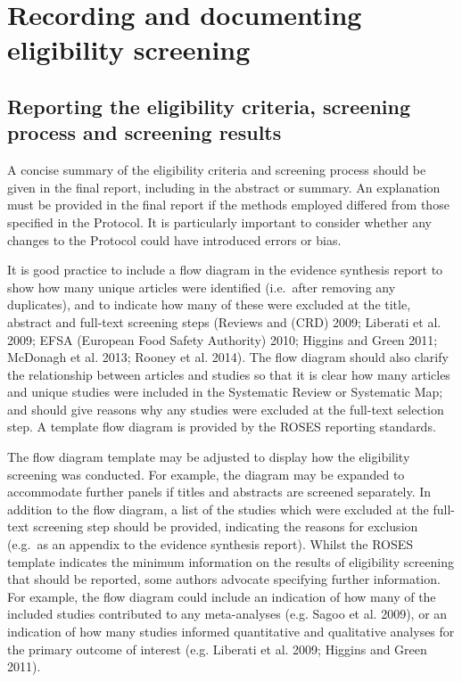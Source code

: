 \documentclass[
  letterpaper,
  DIV=11,
  numbers=noendperiod]{scrreprt}
\begin{document}
\section{Recording and documenting eligibility
screening}\label{recording-and-documenting-eligibility-screening}

\subsection{Reporting the eligibility criteria, screening process and
screening
results}\label{reporting-the-eligibility-criteria-screening-process-and-screening-results}

A concise summary of the eligibility criteria and screening process
should be given in the final report, including in the abstract or
summary. An explanation must be provided in the final report if the
methods employed differed from those specified in the Protocol. It is
particularly important to consider whether any changes to the Protocol
could have introduced errors or bias.

It is good practice to include a flow diagram in the evidence synthesis
report to show how many unique articles were identified (i.e.~after
removing any duplicates), and to indicate how many of these were
excluded at the title, abstract and full-text screening steps (Reviews
and (CRD) 2009; Liberati et al. 2009; EFSA (European Food Safety
Authority) 2010; Higgins and Green 2011; McDonagh et al. 2013; Rooney et
al. 2014). The flow diagram should also clarify the relationship between
articles and studies so that it is clear how many articles and unique
studies were included in the Systematic Review or Systematic Map; and
should give reasons why any studies were excluded at the full-text
selection step. A template flow diagram is provided by the ROSES
reporting standards.

The flow diagram template may be adjusted to display how the eligibility
screening was conducted. For example, the diagram may be expanded to
accommodate further panels if titles and abstracts are screened
separately. In addition to the flow diagram, a list of the studies which
were excluded at the full-text screening step should be provided,
indicating the reasons for exclusion (e.g.~as an appendix to the
evidence synthesis report). Whilst the ROSES template indicates the
minimum information on the results of eligibility screening that should
be reported, some authors advocate specifying further information. For
example, the flow diagram could include an indication of how many of the
included studies contributed to any meta-analyses (e.g. Sagoo et al.
2009), or an indication of how many studies informed quantitative and
qualitative analyses for the primary outcome of interest (e.g. Liberati
et al. 2009; Higgins and Green 2011).
\end{document}
